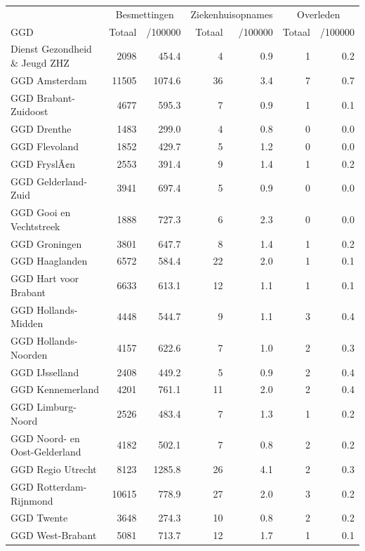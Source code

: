 \documentclass[
  english,
  man,floatsintext]{apa6}
\begin{document}
\begin{table}
\centering\begingroup\fontsize{10}{12}\selectfont

\begin{threeparttable}
\begin{tabular}{lrrrrrr}
\toprule
\multicolumn{1}{c}{ } & \multicolumn{2}{c}{Besmettingen} & \multicolumn{2}{c}{Ziekenhuisopnames} & \multicolumn{2}{c}{Overleden} \\
\cmidrule(l{3pt}r{3pt}){2-3} \cmidrule(l{3pt}r{3pt}){4-5} \cmidrule(l{3pt}r{3pt}){6-7}
GGD & Totaal & /100000 & Totaal & /100000 & Totaal & /100000\\
\midrule
Dienst Gezondheid \& Jeugd ZHZ & 2098 & 454.4 & 4 & 0.9 & 1 & 0.2\\
GGD Amsterdam & 11505 & 1074.6 & 36 & 3.4 & 7 & 0.7\\
GGD Brabant-Zuidoost & 4677 & 595.3 & 7 & 0.9 & 1 & 0.1\\
GGD Drenthe & 1483 & 299.0 & 4 & 0.8 & 0 & 0.0\\
GGD Flevoland & 1852 & 429.7 & 5 & 1.2 & 0 & 0.0\\
GGD FryslÃ¢n & 2553 & 391.4 & 9 & 1.4 & 1 & 0.2\\
GGD Gelderland-Zuid & 3941 & 697.4 & 5 & 0.9 & 0 & 0.0\\
GGD Gooi en Vechtstreek & 1888 & 727.3 & 6 & 2.3 & 0 & 0.0\\
GGD Groningen & 3801 & 647.7 & 8 & 1.4 & 1 & 0.2\\
GGD Haaglanden & 6572 & 584.4 & 22 & 2.0 & 1 & 0.1\\
GGD Hart voor Brabant & 6633 & 613.1 & 12 & 1.1 & 1 & 0.1\\
GGD Hollands-Midden & 4448 & 544.7 & 9 & 1.1 & 3 & 0.4\\
GGD Hollands-Noorden & 4157 & 622.6 & 7 & 1.0 & 2 & 0.3\\
GGD IJsselland & 2408 & 449.2 & 5 & 0.9 & 2 & 0.4\\
GGD Kennemerland & 4201 & 761.1 & 11 & 2.0 & 2 & 0.4\\
GGD Limburg-Noord & 2526 & 483.4 & 7 & 1.3 & 1 & 0.2\\
GGD Noord- en Oost-Gelderland & 4182 & 502.1 & 7 & 0.8 & 2 & 0.2\\
GGD Regio Utrecht & 8123 & 1285.8 & 26 & 4.1 & 2 & 0.3\\
GGD Rotterdam-Rijnmond & 10615 & 778.9 & 27 & 2.0 & 3 & 0.2\\
GGD Twente & 3648 & 274.3 & 10 & 0.8 & 2 & 0.2\\
GGD West-Brabant & 5081 & 713.7 & 12 & 1.7 & 1 & 0.1\\

\end{tabular}
\end{threeparttable}
\end{table}
\end{document}
